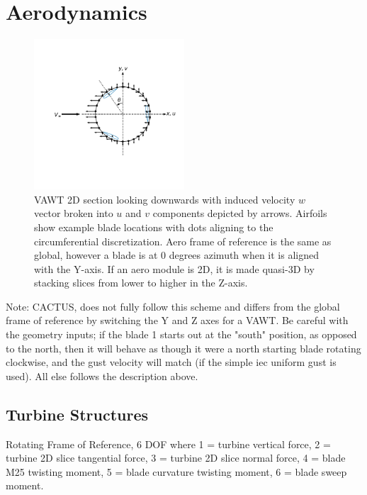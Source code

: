 \documentclass[11pt]{article}
\begin{document}
\section{Aerodynamics}

\begin{figure}[H]
\centering
\vspace{-12pt}
\includegraphics[trim={1.3cm 2.4cm .5cm 1.5cm},clip,width=0.5\textwidth]{./figs/vawt_slice}
\vspace{-12pt}
\caption{VAWT 2D section looking downwards with induced velocity \(w\) vector broken into \(u\) and \(v\) components depicted by arrows. Airfoils show example blade locations with dots aligning to the circumferential discretization.  Aero frame of reference is the same as global, however a blade is at 0 degrees azimuth when it is aligned with the Y-axis.  If an aero module is 2D, it is made quasi-3D by stacking slices from lower to higher in the Z-axis.}
\label{fig:ac_velocities}
\end{figure}

Note: CACTUS, does not fully follow this scheme and differs from the global frame of reference by switching the Y and Z axes for a VAWT.  Be careful with the geometry inputs; if the blade 1 starts out at the "south" position, as opposed to the north, then it will behave as though it were a north starting blade rotating clockwise, and the gust velocity will match (if the simple iec uniform gust is used).  All else follows the description above.

\subsection{Turbine Structures}

Rotating Frame of Reference, 6 DOF where 1 = turbine vertical force, 2 = turbine 2D slice tangential force, 3 = turbine 2D slice normal force, 4 = blade M25 twisting moment, 5 = blade curvature twisting moment, 6 = blade sweep moment.
\end{document}
